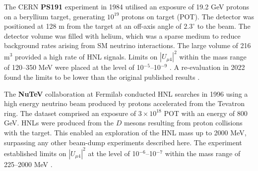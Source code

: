 \begin{coloritemize}


\item The CERN \textbf{PS191} experiment in 1984 utilised an exposure of 19.2 GeV protons on a beryllium target, generating $10^{19}$ protons on target (POT).
The detector was positioned at 128 m from the target at an off-axis angle of $2.3^{\circ}$ to the beam.
The detector volume was filled with helium, which was a sparse medium to reduce background rates arising from SM neutrino interactions.
The large volume of 216 m$^3$ provided a high rate of HNL signals. 
Limits on $|U_{\mu4}|^{2}$ within the mass range of 120--350 MeV were placed at the level of 10$^{-5}$--10$^{-9}$ \cite{PS191A, PS191B}.
A re-evaluation in 2022 found the limits to be lower than the original published results \cite{PS191C}.
	

\item The \textbf{NuTeV} collaboration at Fermilab conducted HNL searches in 1996 using a high energy neutrino beam produced by protons accelerated from the Tevatron ring.
The dataset comprised an exposure of $3 \times 10^{18}$ POT with an energy of 800 GeV.
HNLs were produced from the $D$ mesons resulting from proton collisions with the target.
This enabled an exploration of the HNL mass up to 2000 MeV, surpassing any other beam-dump experiments described here.
The experiment established limits on $|U_{\mu4}|^{2}$ at the level of 10$^{-6}$--10$^{-7}$ within the mass range of 225--2000 MeV \cite{NuTeV}.


\end{coloritemize}

